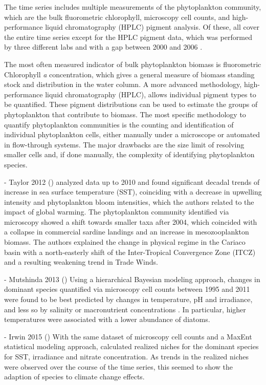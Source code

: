     The time series includes multiple measurements of the phytoplankton community, which are the bulk fluorometric chlorophyll, microscopy cell counts, and high-performance liquid chromatography (HPLC) pigment analysis. Of these, all cover the entire time series except for the HPLC pigment data, which was performed by three different labs and with a gap between 2000 and 2006 \cite{muller-karger_scientific_2019}. 

    The most often measured indicator of bulk phytoplankton biomass is fluorometric Chlorophyll \textit{a} concentration, which gives a general measure of biomass standing stock and distribution in the water column. A more advanced methodology, high-performance liquid chromatography (HPLC), allows individual pigment types to be quantified. These pigment distributions can be used to estimate the groups of phytoplankton that contribute to biomass. The most specific methodology to quantify phytoplankton communities is the counting and identification of individual phytoplankton cells, either manually under a microscope or automated in flow-through systems. The major drawbacks are the size limit of resolving smaller cells and, if done manually, the complexity of identifying phytoplankton species. 


    - Taylor 2012 ()
     analyzed data up to 2010 and found significant decadal trends of increase in sea surface temperature (SST), coinciding with a decrease in upwelling intensity and phytoplankton bloom intensities, which the authors related to the impact of global warming. The phytoplankton community identified via microscopy showed a shift towards smaller taxa after 2004, which coincided with a collapse in commercial sardine landings and an increase in mesozooplankton biomass. The authors explained the change in physical regime in the Cariaco basin with a north-easterly shift of the Inter-Tropical Convergence Zone (ITCZ) and a resulting weakening trend in Trade Winds.
    
    - Mutshinda 2013 ()
    Using a hierarchical Bayesian modeling approach, changes in dominant species quantified via microscopy cell counts between 1995 and 2011 were found to be best predicted by changes in temperature, pH and irradiance, and less so by salinity or macronutrient concentrations \cite{mutshinda_environmental_2013}. In particular, higher temperatures were associated with a lower abundance of diatoms. 
    
    - Irwin 2015 ()
    With the same dataset of microscopy cell counts and a MaxEnt statistical modeling approach,  calculated realized niches for the dominant species for SST, irradiance and nitrate concentration. As trends in the realized niches were observed over the course of the time series, this seemed to show the adaption of species to climate change effects. 
    
